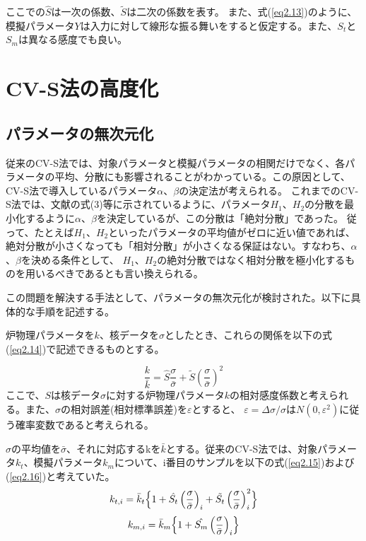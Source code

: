\documentclass[a4paper,11pt,titlepage,uplatex]{jsreport}
\begin{document}
ここでの$\hat{S}$は一次の係数、$\tilde{S}$は二次の係数を表す。
また、式(\ref{eq2.13})のように、模擬パラメータ$Y$は入力に対して線形な振る舞いをすると仮定する。また、$S_t$と$S_m$は異なる感度でも良い。

\section{CV-S法の高度化}
\subsection{パラメータの無次元化}
従来のCV-S法では、対象パラメータと模擬パラメータの相関だけでなく、各パラメータの平均、分散にも影響されることがわかっている。この原因として、CV-S法で導入しているパラメータ$\alpha$、$\beta$の決定法が考えられる。
これまでのCV-S法では、文献の式(3)等に示されているように、パラメータ$H_1$、$H_2$の分散を最小化するように$\alpha$、$\beta$を決定しているが、この分散は「絶対分散」であった。
従って、たとえば$H_1$、$H_2$といったパラメータの平均値がゼロに近い値であれば、絶対分散が小さくなっても「相対分散」が小さくなる保証はない。すなわち、$\alpha$、$\beta$を決める条件として、
$H_1$、$H_2$の絶対分散ではなく相対分散を極小化するものを用いるべきであるとも言い換えられる。

この問題を解決する手法として、パラメータの無次元化が検討された\cite{suzuki2022}。以下に具体的な手順を記述する。

炉物理パラメータを$k$、核データを$\sigma$としたとき、これらの関係を以下の式(\ref{eq2.14})で記述できるものとする。

\begin{equation}
  \frac{k}{\bar{k}} = \hat{S} \frac{\sigma}{\bar{\sigma}} + \tilde{S} \left(\frac{\sigma}{\bar{\sigma}}\right)^2
  \label{eq2.14}
\end{equation}
ここで、$S$は核データ$\sigma$に対する炉物理パラメータ$k$の相対感度係数と考えられる。また、$\sigma$の相対誤差(相対標準誤差)を$\varepsilon$とすると、
$\varepsilon = \Delta \sigma / \sigma$は$N\left(0,\varepsilon^2\right)$に従う確率変数であると考えられる。

$\sigma$の平均値を$\bar{\sigma}$、それに対応するkを$\bar{k}$とする。従来のCV-S法では、対象パラメータ$k_t$、模擬パラメータ$k_m$について、i番目のサンプルを以下の式(\ref{eq2.15})および(\ref{eq2.16})と考えていた。
\begin{equation}
  k_{t,i} = \bar{k}_t \Bigl\{ 1 + \hat{S_t} \left(\frac{\sigma}{\bar{\sigma}}\right)_i + \tilde{S_t} \left(\frac{\sigma}{\bar{\sigma}}\right)_i^2 \Bigr\}
  \label{eq2.15}
\end{equation}
\begin{equation}
  k_{m,i} = \bar{k}_{m} \Bigl\{1+\hat{S_m} \left(\frac{\sigma}{\bar{\sigma}}\right)_i \Bigr\}
  \label{eq2.16}
\end{equation}
\end{document}
